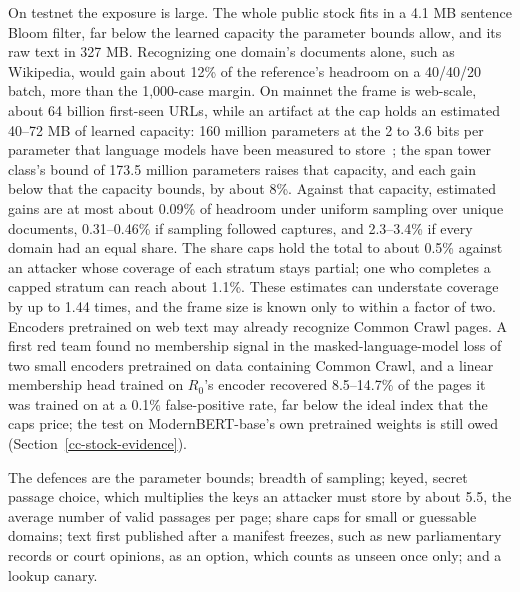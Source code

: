 On testnet the exposure is large. The whole public stock fits in a 4.1 MB
sentence Bloom filter, far below the learned capacity the parameter bounds
allow, and its raw text in 327 MB.
Recognizing one domain's documents alone, such as Wikipedia, would gain about
12\% of the reference's headroom on a 40/40/20 batch, more than the 1,000-case
margin. On mainnet the frame is web-scale, about 64 billion first-seen URLs, while an artifact at
the cap holds an estimated 40--72 MB of learned capacity: 160 million parameters
at the 2 to 3.6 bits per parameter that language models have been measured to
store~\cite{allenzhuknowledge,morrismemorize}; the span tower class's bound of
173.5 million parameters raises that capacity, and each gain below that the
capacity bounds, by about 8\%. Against that capacity,
estimated gains are at most about 0.09\% of headroom under uniform sampling over
unique documents, 0.31--0.46\% if sampling followed captures, and 2.3--3.4\% if
every domain had an equal share. The share caps hold the total to about 0.5\%
against an attacker whose coverage of each stratum stays partial; one who
completes a capped stratum can reach about 1.1\%. These estimates can
understate coverage by up to 1.44 times, and the frame size is known only to
within a factor of two. Encoders pretrained on web text may already recognize
Common Crawl pages. A first red team found no membership signal in the
masked-language-model loss of two small encoders pretrained on data containing
Common Crawl, and a linear membership head trained on \(R_0\)'s encoder recovered
8.5--14.7\% of the pages it was trained on at a 0.1\% false-positive rate, far
below the ideal index that the caps price; the test on ModernBERT-base's own
pretrained weights is still owed (Section~\ref{cc-stock-evidence}).

The defences are the parameter bounds; breadth of sampling; keyed, secret passage
choice, which multiplies the keys an attacker must store by about 5.5, the
average number of valid passages per page; share caps for small or guessable
domains; text first published after a manifest freezes, such as new
parliamentary records or court opinions, as an option, which counts as unseen
once only; and a lookup canary.

